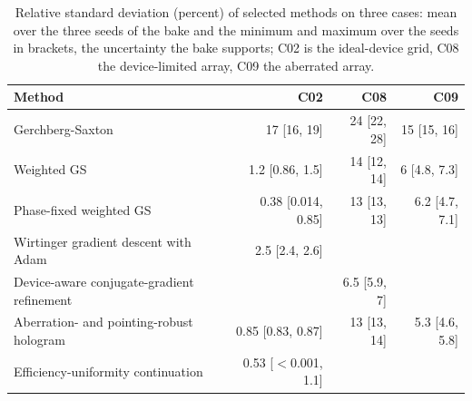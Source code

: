 \begin{table}[t]\centering\footnotesize
\caption{Relative standard deviation (percent) of selected methods on three cases: mean over the three seeds of the bake and the minimum and maximum over the seeds in brackets, the uncertainty the bake supports; C02 is the ideal-device grid, C08 the device-limited array, C09 the aberrated array.}\label{tab:seeds}
\begin{tabular}{@{}>{\raggedright\arraybackslash}p{} rrr@{}}\toprule Method & C02 & C08 & C09\\\midrule
Gerchberg-Saxton & 17 [16, 19] & 24 [22, 28] & 15 [15, 16]\\
Weighted GS & 1.2 [0.86, 1.5] & 14 [12, 14] & 6 [4.8, 7.3]\\
Phase-fixed weighted GS & 0.38 [0.014, 0.85] & 13 [13, 13] & 6.2 [4.7, 7.1]\\
Wirtinger gradient descent with Adam & 2.5 [2.4, 2.6] &  & \\
Device-aware conjugate-gradient refinement &  & 6.5 [5.9, 7] & \\
Aberration- and pointing-robust hologram & 0.85 [0.83, 0.87] & 13 [13, 14] & 5.3 [4.6, 5.8]\\
Efficiency-uniformity continuation & 0.53 [$<$0.001, 1.1] &  & \\
\bottomrule\end{tabular}\end{table}
